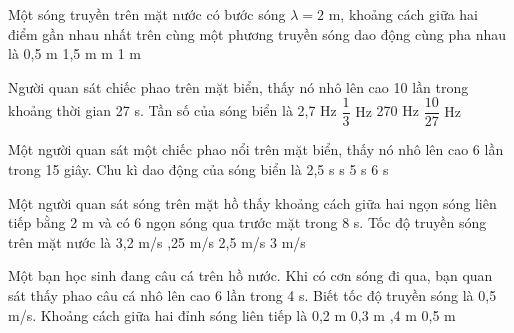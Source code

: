 \begin{ex}%
Một sóng truyền trên mặt nước có bước sóng $\lambda = 2$ m, khoảng cách giữa hai điểm gần nhau nhất trên cùng một phương truyền sóng dao động cùng pha nhau là
\choice
{0,5 m}
{1,5 m}
{ m}
{1 m}
\end{ex} 
\begin{ex}%
Người quan sát chiếc phao trên mặt biển, thấy nó nhô lên cao 10 lần trong khoảng thời gian 27 s. Tần số của sóng biển là
\choice
{2,7 Hz}
{\True $\dfrac{1}{3}$ Hz}
{270 Hz}
{$\dfrac{10}{27}$ Hz}
\end{ex} 
\begin{ex}%
Một người quan sát một chiếc phao nổi trên mặt biển, thấy nó nhô lên cao 6 lần trong 15 giây. Chu kì dao động của sóng biển là
\choice
{2,5 s}
{ s}
{5 s}
{6 s}
\end{ex} 
\begin{ex}%
Một người quan sát sóng trên mặt hồ thấy khoảng cách giữa hai ngọn sóng liên tiếp bằng 2 m và có 6 ngọn sóng qua trước mặt trong 8 s. Tốc độ truyền sóng trên mặt nước là
\choice
{3,2 m/s}
{,25 m/s}
{2,5 m/s}
{3 m/s}
\end{ex} 
\begin{ex}%
Một bạn học sinh đang câu cá trên hồ nước. Khi có cơn sóng đi qua, bạn quan sát thấy phao câu cá nhô lên cao 6 lần trong 4 s. Biết tốc độ truyền sóng là 0,5 m/s. Khoảng cách giữa hai đỉnh sóng liên tiếp là
\choice
{0,2 m}
{0,3 m}
{,4 m}
{0,5 m}
\end{ex} 
